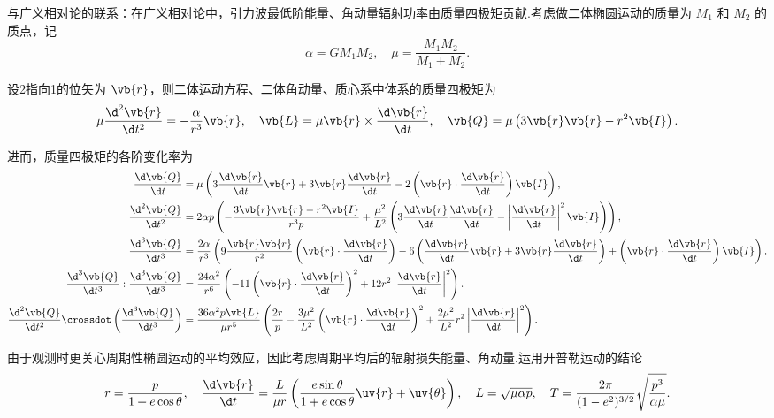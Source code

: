 \begin{notes}
	与广义相对论的联系：在广义相对论中，引力波最低阶能量、角动量辐射功率由质量四极矩贡献.考虑做二体椭圆运动的质量为 \(M_1\) 和 \(M_2\) 的质点，记
	\begin{equation*}
		\alpha = G M_1 M_2, \quad \mu = \frac{M_1 M_2}{M_1 + M_2}.
	\end{equation*}

	设2指向1的位矢为 \(\vb{r}\)，则二体运动方程、二体角动量、质心系中体系的质量四极矩为
	\begin{equation*}
		\mu \frac{\d^2\vb{r}}{\d t^2} = -\frac{\alpha}{r^3}\vb{r}, \quad \vb{L} = \mu \vb{r} \times \frac{\d \vb{r}}{\d t}, \quad \vb{Q} = \mu \left( 3\vb{r}\vb{r} - r^2 \vb{I} \right).
	\end{equation*}

	进而，质量四极矩的各阶变化率为
	\begin{align*}
		\frac{\d \vb{Q}}{\d t} &= \mu \left( 3\frac{\d \vb{r}}{\d t}\vb{r} + 3\vb{r}\frac{\d \vb{r}}{\d t} - 2\left( \vb{r} \cdot \frac{\d \vb{r}}{\d t} \right)\vb{I} \right), \\
		\frac{\d^2\vb{Q}}{\d t^2} &= 2\alpha p \left( -\frac{3\vb{r}\vb{r} - r^2 \vb{I}}{r^3 p} + \frac{\mu^2}{L^2} \left( 3\frac{\d \vb{r}}{\d t}\frac{\d \vb{r}}{\d t} - \left| \frac{\d \vb{r}}{\d t} \right|^2 \vb{I} \right) \right), \\
		\frac{\d^3\vb{Q}}{\d t^3} &= \frac{2\alpha}{r^3} \left( 9\frac{\vb{r}\vb{r}}{r^2} \left( \vb{r} \cdot \frac{\d \vb{r}}{\d t} \right) - 6\left( \frac{\d \vb{r}}{\d t}\vb{r} + 3\vb{r}\frac{\d \vb{r}}{\d t} \right) + \left( \vb{r} \cdot \frac{\d \vb{r}}{\d t} \right)\vb{I} \right).\\
		\frac{\d^3\vb{Q}}{\d t^3} : \frac{\d^3\vb{Q}}{\d t^3} &= \frac{24\alpha^2}{r^6} \left( -11\left( \vb{r} \cdot \frac{\d \vb{r}}{\d t} \right)^2 + 12 r^2 \left| \frac{\d \vb{r}}{\d t} \right|^2 \right).\\
		\frac{\d^2\vb{Q}}{\d t^2} \crossdot \left( \frac{\d^3\vb{Q}}{\d t^3} \right) &= \frac{36\alpha^2 p \vb{L}}{\mu r^5} \left( \frac{2r}{p} - \frac{3\mu^2}{L^2} \left( \vb{r} \cdot \frac{\d \vb{r}}{\d t} \right)^2 + \frac{2\mu^2}{L^2} r^2 \left| \frac{\d \vb{r}}{\d t} \right|^2 \right).
	\end{align*}

	由于观测时更关心周期性椭圆运动的平均效应，因此考虑周期平均后的辐射损失能量、角动量.运用开普勒运动的结论
	\begin{equation*}
		r = \frac{p}{1 + e\cos\theta}, \quad \frac{\d \vb{r}}{\d t} = \frac{L}{\mu r} \left( \frac{e\sin\theta}{1 + e\cos\theta}\uv{r} + \uv{\theta} \right), \quad L = \sqrt{\mu\alpha p}, \quad T = \frac{2\pi}{(1 - e^2)^{3/2}} \sqrt{\frac{p^3}{\alpha\mu}}.
	\end{equation*}


\end{notes}
